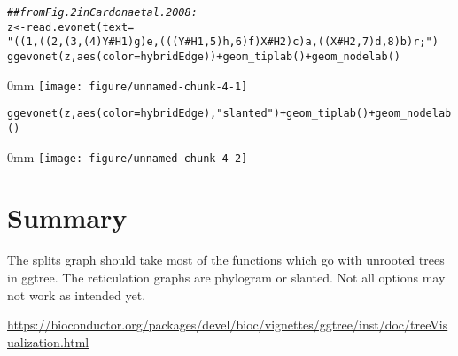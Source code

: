 \documentclass{article}\usepackage[]{graphicx}\usepackage[usenames,dvipsnames]{color}
\makeatletter
\def\maxwidth{ %
  \ifdim\Gin@nat@width>\linewidth
    \linewidth
  \else
    \Gin@nat@width
  \fi
}
\newcommand{\hlstr}[1]{\textcolor[rgb]{0.251,0.627,0.251}{#1}}%
\newcommand{\hlcom}[1]{\textcolor[rgb]{0.502,0.502,0.502}{\textit{#1}}}%
\newcommand{\hlopt}[1]{\textcolor[rgb]{0,0,0}{#1}}%
\newcommand{\hlstd}[1]{\textcolor[rgb]{0.251,0.251,0.251}{#1}}%
\newcommand{\hlkwb}[1]{\textcolor[rgb]{0,0,0}{#1}}%
\newcommand{\hlkwc}[1]{\textcolor[rgb]{0.251,0.251,0.251}{#1}}%
\newcommand{\hlkwd}[1]{\textcolor[rgb]{0.878,0.439,0.125}{#1}}%
\newenvironment{knitrout}{}{} %
\makeatother
\begin{document}
\begin{knitrout}
\color{fgcolor}\begin{kframe}
\begin{alltt}
\hlcom{## from Fig. 2 in Cardona et al. 2008:}
\hlstd{z} \hlkwb{<-} \hlkwd{read.evonet}\hlstd{(}\hlkwc{text} \hlstd{=}
         \hlstr{"((1,((2,(3,(4)Y#H1)g)e,(((Y#H1, 5)h,6)f)X#H2)c)a,((X#H2,7)d,8)b)r;"}\hlstd{)}
\hlkwd{ggevonet}\hlstd{(z,} \hlkwd{aes}\hlstd{(}\hlkwc{color}\hlstd{=hybridEdge))} \hlopt{+} \hlkwd{geom_tiplab}\hlstd{()} \hlopt{+} \hlkwd{geom_nodelab}\hlstd{()}
\end{alltt}
\end{kframe}\begin{adjustwidth}{\fltoffset}{0mm}
\texttt{[image: figure/unnamed-chunk-4-1]} \end{adjustwidth}\begin{kframe}\begin{alltt}
\hlkwd{ggevonet}\hlstd{(z,} \hlkwd{aes}\hlstd{(}\hlkwc{color}\hlstd{=hybridEdge),} \hlstr{"slanted"}\hlstd{)} \hlopt{+} \hlkwd{geom_tiplab}\hlstd{()} \hlopt{+} \hlkwd{geom_nodelab}\hlstd{()}
\end{alltt}
\end{kframe}\begin{adjustwidth}{\fltoffset}{0mm}
\texttt{[image: figure/unnamed-chunk-4-2]} \end{adjustwidth}
\end{knitrout}

\section{Summary}

The splits graph should take most of the functions which go with unrooted
trees in ggtree. The reticulation graphs are phylogram or slanted.
Not all options may not work as intended yet.

\url{https://bioconductor.org/packages/devel/bioc/vignettes/ggtree/inst/doc/treeVisualization.html}



\nocite{Schliep2011}
\nocite{Schliep2017}
\nocite{Paradis2004}
\nocite{Holland2004}
\nocite{Yu2017}
\nocite{Bryant2004}
\nocite{Huson2006}
\nocite{Cardona2008}
\nocite{Wickham2016}


\newpage


\newpage
\appendix
\end{document}
